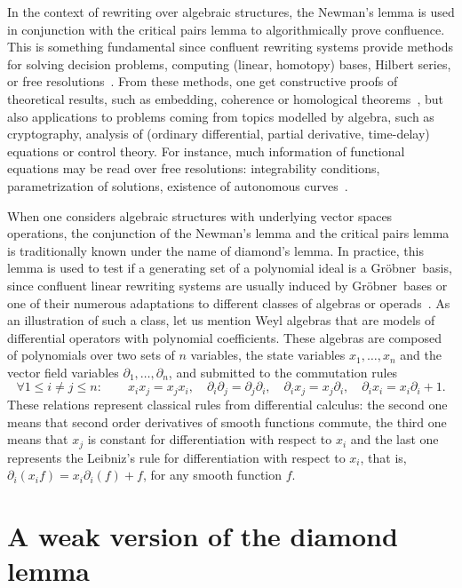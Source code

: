 \documentclass[10pt]{easychair}
\theoremstyle{definition}
\newcommand\G{Gröbner}
\begin{document}
In the context of rewriting over algebraic structures, the Newman's lemma
is used in conjunction with the critical pairs lemma to algorithmically
prove confluence. This is something fundamental since confluent rewriting
systems provide methods for solving decision problems, computing (linear,
homotopy) bases, Hilbert series, or free
resolutions~\cite{MR846601, MR2964639, MR1072284, MR1360005}. From these 
methods, one get constructive proofs of theoretical results, such as 
embedding, coherence or homological theorems~\cite{MR506890, MR0506423,
  MR3347996, MR3742562, MR265437, MR920522}, but also applications to 
problems coming from topics modelled by algebra, such as cryptography, 
analysis of (ordinary differential, partial derivative, time-delay) 
equations or control theory. For instance, much information of 
functional equations may be read over free resolutions: integrability
conditions, parametrization of solutions, existence of autonomous
curves~\cite{MR2233761, MR1308976}.
\medskip

When one considers algebraic structures with underlying vector spaces
operations, the conjunction of the Newman's lemma and the critical pairs lemma
is traditionally known under the name of diamond's lemma. In practice, this
lemma is used to test if a generating set of a polynomial ideal is a \G\ basis,
since confluent linear rewriting systems are usually induced by \G\ bases or one
of their numerous adaptations to different classes of algebras or
operads~\cite{MR506890, MR2202562, MR2667136, MR1044911, MR1299371}. As an
illustration of such a class, let us mention Weyl algebras that are models of
differential operators with polynomial coefficients. These algebras are composed
of polynomials over two sets of $n$ variables, the state variables
$x_1,\ldots,x_n$ and the vector field variables $\partial_1,\ldots,\partial_n$, and submitted to the
commutation rules
\[ \forall 1\leq i\neq j\leq n: \qquad x_ix_j=x_jx_i,
  \quad \partial_i\partial_j=\partial_j\partial_i, \quad \partial_ix_j=x_j\partial_i, \quad
\partial_ix_i=x_i\partial_i+1. \]
These relations represent classical rules from differential calculus: the
second one means that second order derivatives of smooth functions
commute, the third one means that $x_j$ is constant for differentiation
with respect to $x_i$ and the last one represents the Leibniz's rule for
differentiation with respect to $x_i$, that is,
$\partial_i(x_if)=x_i\partial_i(f)+f$, for any smooth function $f$.
\medskip

\section{A weak version of the diamond lemma}
\label{sec:a_weak_version_of_the_diamond_lemma}
\end{document}
